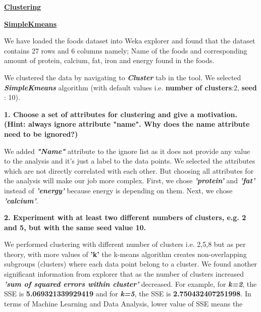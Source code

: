 \documentclass[a4paper,10pt]{article}
\begin{document}
\begin{center}
	\large\textbf{\underline{Clustering}} \par
\end{center}
\textbf{\large\underline{SimpleKmeans}} \par
We have loaded the foods dataset into Weka explorer and found that the dataset contains 27 rows and 6 columns namely;
Name of the foods and corresponding amount of protein, calcium, fat, iron and energy found in the foods. \par
We clustered the data by navigating to \textbf{\textit{Cluster}} tab in the tool. We selected 
\textbf{\textit{SimpleKmeans}} algorithm (with default values i.e. \textbf{number of clusters}:2, \textbf{seed} : 10).
\par
\textbf{1. Choose a set of attributes for clustering and give a motivation. (Hint: always ignore attribute "name". Why does the name attribute need to be ignored?)}\par
We added \textbf{\textit{"Name"}} attribute to the ignore list as it does not provide any value to the analysis and it's just a 
label to the data points. We selected the attributes which are not directly correlated with each other. But choosing
all attributes for the analysis will make our job more complex. First, we chose \textbf{\textit{'protein'}}
and \textbf{\textit{'fat'}} instead of \textbf{\textit{'energy'}} because energy is depending on them. 
Next, we chose \textbf{\textit{'calcium'}}. \par
\textbf{2. Experiment with at least two different numbers of clusters, e.g. 2 and 5, but with the same seed value 10.}\par
We performed clustering with different number of clusters i.e. 2,5,8 but as per theory, with more values of \textbf{'k'}
the k-means algorithm creates non-overlapping subgroups (clusters) where each data point belong to a cluster. We found another significant
information from explorer that as the number of clusters increased \textbf{\textit{'sum of squared errors within cluster'}} decreased.
For example, for \textbf{\textit{k=2}}, the SSE is \textbf{5.069321339929419} and for \textbf{\textit{k=5}}, the
SSE is \textbf{2.750432407251998}. In terms of Machine Learning and Data Analysis, lower value of SSE means the 
\end{document}
